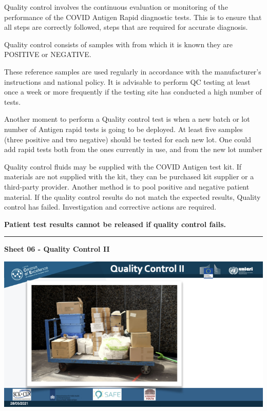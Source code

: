 \documentclass[
]{book}
\begin{document}
Quality control involves the continuous evaluation or monitoring of the
performance of the COVID Antigen Rapid diagnostic tests. This is to
ensure that all steps are correctly followed, steps that are required
for accurate diagnosis.

Quality control consists of samples with from which it is known they are
POSITIVE or NEGATIVE.

These reference samples are used regularly in accordance with the
manufacturer's instructions and national policy. It is advisable to
perform QC testing at least once a week or more frequently if the
testing site has conducted a high number of tests.

Another moment to perform a Quality control test is when a new batch or
lot number of Antigen rapid tests is going to be deployed. At least five
samples (three positive and two negative) should be tested for each new
lot. One could add rapid tests both from the ones currently in use, and
from the new lot number

Quality control fluids may be supplied with the COVID Antigen test kit.
If materials are not supplied with the kit, they can be purchased kit
supplier or a third-party provider. Another method is to pool positive
and negative patient material. If the quality control results do not
match the expected results, Quality control has failed. Investigation
and corrective actions are required.

\textbf{Patient test results cannot be released if quality control fails.}

\begin{center}\rule{0.5\linewidth}{0.5pt}\end{center}

\textbf{Sheet 06 - Quality Control II}

\includegraphics{images/m04/m04_Quality_management_v3.006.jpeg}
\end{document}
